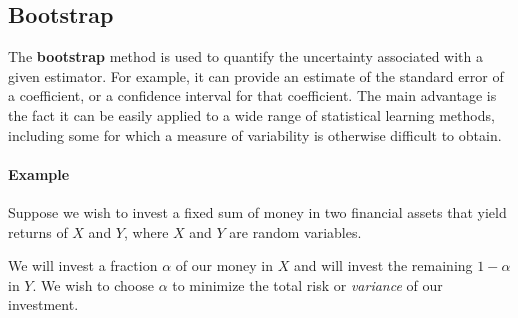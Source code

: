 

\subsection*{Bootstrap}
The \textbf{bootstrap} method is used to quantify the uncertainty associated with a given estimator. For example, it can provide an estimate of the standard error of a coefficient, or a confidence interval for that coefficient. The main advantage is the fact it can be easily applied to a wide range of statistical learning methods, including some for which a measure of variability is otherwise difficult to obtain.

\paragraph*{Example}
Suppose we wish to invest a fixed sum of money in two financial assets that yield returns of $X$ and $Y$, where $X$ and $Y$ are random variables.

We will invest a fraction $\alpha$ of our money in $X$ and will invest the remaining $1-\alpha$ in $Y$. We wish to choose $\alpha$ to minimize the total risk or \textit{variance} of our investment.

